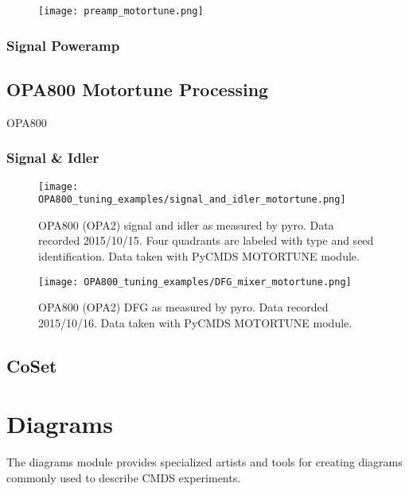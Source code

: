 \begin{figure}
	\begin{centering}
		\texttt{[image: preamp\_motortune.png]}
		\caption{}
	\end{centering}
	\label{fig:TOPAS preamp motortune}
\end{figure}


\subsubsection{Signal Poweramp}

\subsection{OPA800 Motortune Processing}

OPA800 

\subsubsection{Signal \& Idler}

\begin{figure}
	\begin{centering}
		\texttt{[image: OPA800\_tuning\_examples/signal\_and\_idler\_motortune.png]}
		\caption{OPA800 (OPA2) signal and idler as measured by pyro. Data recorded 2015/10/15. Four quadrants are labeled with type and seed identification. Data taken with PyCMDS MOTORTUNE module.}
	\end{centering}
	\label{fig:opa800 signal and idler}
\end{figure}

\begin{figure}
	\begin{centering}
		\texttt{[image: OPA800\_tuning\_examples/DFG\_mixer\_motortune.png]}
		\caption{OPA800 (OPA2) DFG as measured by pyro. Data recorded 2015/10/16. Data taken with PyCMDS MOTORTUNE module.}
	\end{centering}
	\label{fig:opa800 DFG}
\end{figure}

\subsection{CoSet}

\pagebreak
\section{Diagrams}

The diagrams module provides specialized artists and tools for creating diagrams commonly used to describe CMDS experiments.

